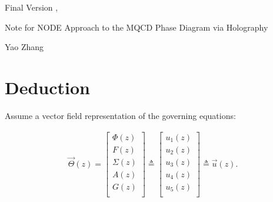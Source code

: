 \documentclass[11pt]{article}
\renewcommand{\today}{\shortmonthname[\the\month] \the \day,  \the\year}
\begin{document}
	\kaishu 
	\thispagestyle{empty}
	\setcounter{section}{0}
	
	\begin{flushright}
		\tiny Final Version \today 
	\end{flushright}
	
	\begin{center}
		{\Large  Note  for NODE Approach to the MQCD Phase Diagram via Holography }
		
		{\large Yao Zhang}
	\end{center}
\setcounter{page}{1}


\section{Deduction}

Assume a vector field representation of the governing equations:

\begin{equation}
	\begin{split}
		\vec \Theta \left( z \right) = \left[ {\begin{matrix}
			{\Phi \left( z \right)}  \\ 
			{F\left( z \right)}  \\ 
			{\Sigma \left( z \right)}  \\ 
			{A\left( z \right)}  \\ 
			{G\left( z \right)}  \\ 
			\end{matrix} } \right] \triangleq \left[ {\begin{matrix}
			{{u_1}\left( z \right)}  \\ 
			{{u_2}\left( z \right)}  \\ 
			{{u_3}\left( z \right)}  \\ 
			{{u_4}\left( z \right)}  \\ 
			{{u_5}\left( z \right)}  \\ 
			\end{matrix} } \right] \triangleq \vec u\left( z \right).
	\end{split}
\end{equation}
\end{document}
